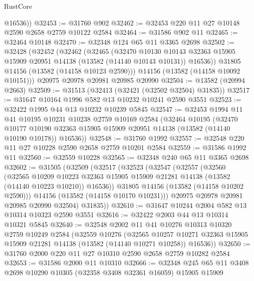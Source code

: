 \begin{lexlean}{RustCore}
\begin{coremodule}
        @16536))
@32453 := @31760 @902
@32462 := @32453 @220 @11 @27 @10148 @2590 @2658 @2759 @10122 @2584
@32464 := @31586 @902 @11
@32465 := @32464 @10148
@32470 := @32348 @124 @65 @11 @3365 @2698
@32502 := @32428
    (@32452
      (@32462
        (@32465
          (@32470
            @10130
            @10143
            @32363
            @15905
            @15909
            @20951
            @14138
            (@13582 (@14140 @10143 @10131))
            @16536))
        @31805
        @14156
        (@13582 (@14158 @10123 @2590)))
      @14156
      (@13582 (@14158 @10092 @10151)))
    @20975
    @20978
    @20981
    @20985
    @20990
@32504 := @13582 (@20994 @2663)
@32509 := @31513 (@32413 (@32421 (@32502 @32504) @31835))
@32517 := @31647 @10164 @1996 @582 @13 @10232 @10241 @2590 @3551
@32523 := @32422 @1995 @44 @13 @10232 @10239 @5845
@32547 := @32453
    @1994
    @11
    @41
    @10195
    @10231
    @10238
    @2759
    @10169
    @2584
    (@32464
      @10195
      (@32470
        @10177
        @10190
        @32363
        @15905
        @15909
        @20951
        @14138
        (@13582 (@14140 @10190 @10178))
        @16536))
@32548 := @31760 @1992
@32557 := @32548 @220 @11 @27 @10228 @2590 @2658 @2759 @10201 @2584
@32559 := @31586 @1992 @11
@32560 := @32559 @10228
@32565 := @32348 @240 @65 @11 @3365 @2698
@32602 := @31505
    (@32509
      (@32517
        (@32523
          (@32547
            (@32557
              (@32560
                (@32565
                  @10209
                  @10223
                  @32363
                  @15905
                  @15909
                  @21281
                  @14138
                  (@13582 (@14140 @10223 @10210))
                  @16536))
              @31805
              @14156
              (@13582 (@14158 @10202 @2590)))
            @14156
            (@13582 (@14158 @10170 @10231)))
          @20975
          @20978
          @20981
          @20985
          @20990
          @32504)
        @31835))
@32610 := @31647 @10244 @2004 @582 @13 @10314 @10323 @2590 @3551
@32616 := @32422 @2003 @44 @13 @10314 @10321 @5845
@32640 := @32548
    @2002
    @11
    @41
    @10276
    @10313
    @10320
    @2759
    @10249
    @2584
    (@32559
      @10276
      (@32565
        @10257
        @10271
        @32363
        @15905
        @15909
        @21281
        @14138
        (@13582 (@14140 @10271 @10258))
        @16536))
@32650 := @31760 @2000 @220 @11 @27 @10310 @2590 @2658 @2759 @10282 @2584
@32653 := @31586 @2000 @11 @10310
@32666 := @32348 @245 @65 @11 @3408 @2698 @10290 @10305 (@32358 @3408 @32361 @16059) @15905 @15909

\end{coremodule}
\end{lexlean}
